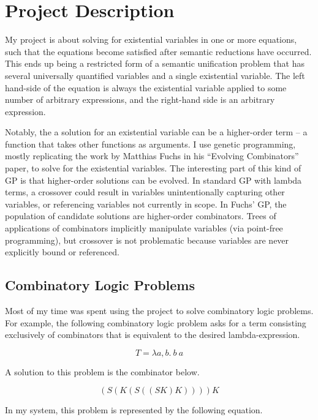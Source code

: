 \documentclass{article}
\begin{document}
\maketitle

\section{Project Description}

My project is about solving for existential variables in one or more
equations, such that the equations become satisfied after semantic
reductions have occurred. This ends up being a restricted form of a
semantic unification problem that has several universally quantified
variables and a single existential variable. The left hand-side of the
equation is always the existential variable applied to some number of
arbitrary expressions, and the right-hand side is an arbitrary expression.

Notably, the a solution for an existential variable can be a
higher-order term -- a function that takes other functions as
arguments. I use genetic programming, mostly replicating the work by
Matthias Fuchs in his ``Evolving Combinators'' paper, to solve for the
existential variables. The interesting part of this kind of GP is that
higher-order solutions can be evolved. In standard GP with lambda
terms, a crossover could result in variables unintentionally capturing
other variables, or referencing variables not currently in scope. In
Fuchs' GP, the population of candidate solutions are higher-order
combinators. Trees of applications of combinators implicitly
manipulate variables (via point-free programming), but crossover is
not problematic because variables are never explicitly bound or
referenced.

\subsection{Combinatory Logic Problems}

Most of my time was spent using the project to solve combinatory logic
problems. For example, the following combinatory logic problem asks for a term
consisting exclusively of combinators that is equivalent to the
desired lambda-expression.

$$
T = \lambda a,b . ~ b ~ a
$$

A solution to this problem is the combinator below.

$$
(S(K(S((SK)K))))K
$$

In my system, this problem is represented by the following equation.
\end{document}
